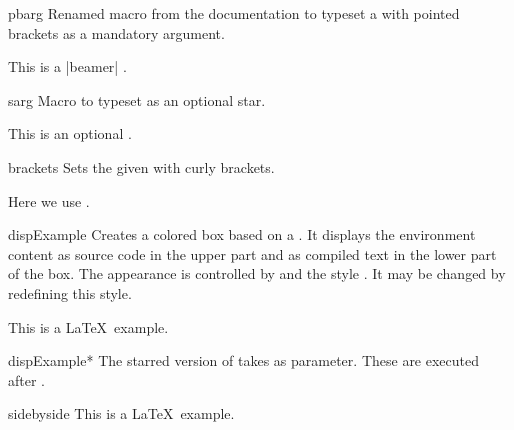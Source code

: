 \clearpage

\begin{docCommand}[doc new={2025-05-28}]{pbarg}{}
  Renamed macro from the  \cite{tantau:beamer} documentation to
  typeset a  with pointed brackets as a mandatory argument.
\begin{dispExample}
This is a |beamer| .
\end{dispExample}
\end{docCommand}


\begin{docCommand}[doc new=2023-02-16]{sarg}{}
  Macro to typeset \sarg{} as an optional star.
\begin{dispExample}
This is an optional \sarg.
\end{dispExample}
\end{docCommand}


\begin{docCommand}{brackets}{}
  Sets the given  with curly brackets.
\begin{dispExample}
  Here we use .
\end{dispExample}
\end{docCommand}


{\let\xdispExample\dispExample
  \let\endxdispExample\enddispExample
\begin{docEnvironment}[doc updated=2014-10-10]{dispExample}{}
  Creates a colored box based on a .
  It displays the environment content as source code in the upper part
  and as compiled text in the lower part of the box.
  The appearance is controlled by 
  and the style . It may be
  changed by redefining this style.
{
\begin{xdispExample}
\begin{dispExample}
This is a \LaTeX\ example.
\end{dispExample}
\end{xdispExample}
}
\end{docEnvironment}}


{\let\xdispExample\dispExample
  \let\endxdispExample\enddispExample
\begin{docEnvironment}[doc updated=2014-10-10]{dispExample*}{}
  The starred version of  takes  
  as parameter. These  are executed after .
\begin{xdispExample}
\begin{dispExample*}{sidebyside}
This is a \LaTeX\ example.
\end{dispExample*}
\end{xdispExample}
\end{docEnvironment}}


